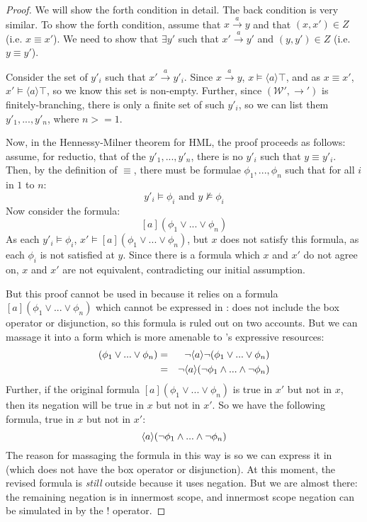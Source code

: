 \begin{proof}
We will show the forth condition in detail. The back condition is very
similar.  To show the forth condition, assume that $x \xrightarrow{a}
y$ and that $(x,x') \in Z$ (i.e. $x \equiv x'$).  We need to show that
$\exists y'$ such that $x' \xrightarrow{a} y'$ and $(y,y') \in Z$
(i.e. $y \equiv y'$).

Consider the set of $y'_i$ such that $x' \xrightarrow{a} y'_i$. Since
$x \xrightarrow{a} y$, $x \models \langle a \rangle \top$, and as $x
\equiv x'$, $x' \models \langle a \rangle \top$, so we know this set
is non-empty.  Further, since $(\mathcal{W}', \rightarrow')$ is
finitely-branching, there is only a finite set of such $y'_i$, so we
can list them $y'_1, ..., y'_n$, where $n >= 1$.

Now, in the Hennessy-Milner theorem for HML, the proof proceeds as
follows: assume, for reductio, that of the $y'_1, ..., y'_n$, there is
no $y'_i$ such that $y \equiv y'_i$.  Then, by the definition of
$\equiv$, there must be formulae $\phi_1, ..., \phi_n$ such that for
all $i$ in $1$ to $n$:
\[
y'_i \models \phi_i \mbox{ and } y \nvDash \phi_i
\]
Now consider the formula:
\[
[a] (\phi_1 \lor ... \lor \phi_n)
\]
As each $y'_i \models \phi_i$, $x' \models [a] (\phi_1 \lor ... \lor \phi_n)$, but $x$ does not satisfy this formula, as each $\phi_i$ is not satisfied at $y$.
Since there is a formula which $x$ and $x'$ do not agree on, $x$ and $x'$ are not equivalent, contradicting our initial assumption.

But this proof cannot be used in \cathoristic{} because it relies on a formula $[a] (\phi_1 \lor ... \lor \phi_n)$ which cannot be expressed in \cathoristic{}: 
\Cathoristic{} does not include the box operator or disjunction, so this formula is ruled out on two accounts.
But we can massage it into a form which is more amenable to \cathoristic{}'s expressive resources:
\begin{eqnarray*}
[a] (\phi_1 \lor ... \lor \phi_n) & = & \neg \langle a \rangle \neg (\phi_1 \lor ... \lor \phi_n)  \\
	& = & \neg \langle a \rangle (\neg \phi_1\AND ... \AND \neg \phi_n) 
\end{eqnarray*}
Further, if the original formula $[a] (\phi_1 \lor ... \lor \phi_n)$ is true in $x'$ but not in $x$, then its negation will be true in $x$ but not in $x'$. 
So we have the following formula, true in $x$ but not in $x'$:
\[
 \langle a \rangle (\neg \phi_1\land ... \land \neg \phi_n)
 \]
The reason for massaging the formula in this way is so we can express it in \cathoristic{} (which does not have the box operator or disjunction).
At this moment, the revised formula is \emph{still} outside \cathoristic{} because it uses negation. 
But we are almost there: the remaining negation is in innermost scope, and innermost scope negation can be simulated in \cathoristic{} by the $!$ operator. 


\end{proof}
